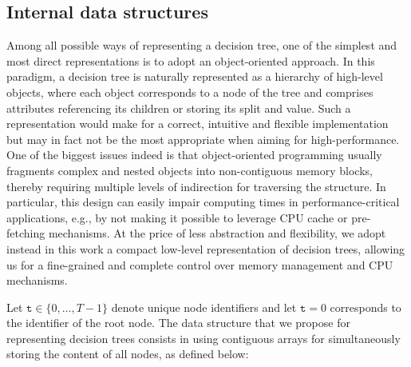 \subsection{Internal data structures}

Among all possible ways of representing a decision tree, one of the simplest and most
direct representations is to adopt an object-oriented approach. In this
paradigm, a decision tree is naturally represented as a hierarchy of high-level
objects, where each object corresponds to a node of the tree and comprises
attributes referencing its children or storing its split and value. Such a
representation would make for a correct, intuitive and flexible implementation
but may in fact not be the most appropriate when aiming for high-performance.
One of the biggest issues indeed is that object-oriented programming usually
fragments complex and nested objects into non-contiguous memory blocks, thereby
requiring multiple levels of indirection for traversing the structure. In
particular, this design can easily impair computing times in
performance-critical applications, e.g., by not making it possible to leverage CPU cache or
pre-fetching mechanisms.
At the price of less abstraction and flexibility, we adopt instead in this work
a compact low-level representation of decision trees, allowing us for a fine-grained
and complete control over memory management and CPU mechanisms.

Let $\texttt{t}\in \{0,\dots,T-1\}$ denote unique node identifiers and let
$\texttt{t}=0$ corresponds to the identifier of the root node. The data
structure that we propose for representing decision trees consists in using
contiguous arrays for simultaneously storing the content of all nodes, as
defined below:

